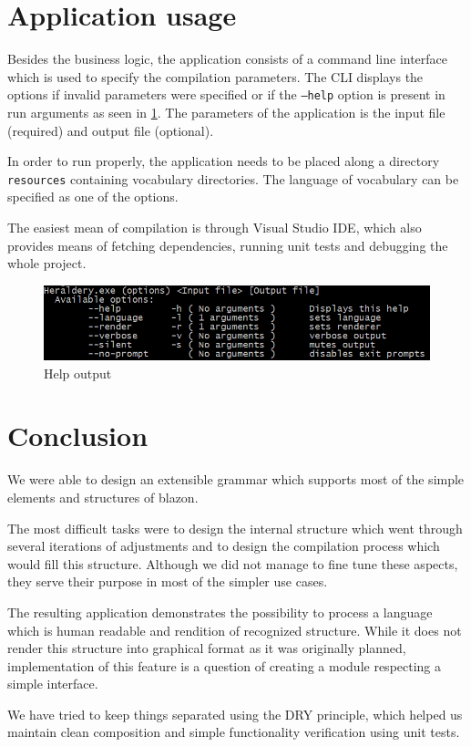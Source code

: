 \documentclass[12pt,a4paper]{article}
\let\oldsection\section
\renewcommand\section{\clearpage\oldsection}
\begin{document}
\section{Application usage}
Besides the business logic, the application consists of a command line interface which is used to specify the compilation parameters.
The CLI displays the options if invalid parameters were specified or if the \texttt{--help} option is present in run arguments as seen in \ref{fig:cli-help}.
The parameters of the application is the input file (required) and output file (optional).

In order to run properly, the application needs to be placed along a directory \texttt{resources} containing vocabulary directories.
The language of vocabulary can be specified as one of the options.

The easiest mean of compilation is through Visual Studio IDE, which also provides means of fetching dependencies, running unit tests and debugging the whole project.

\begin{figure}[h]
	\centering
	\includegraphics[width=1\linewidth]{img/cli-help}
	\caption{Help output}
	\label{fig:cli-help}
\end{figure}


\section{Conclusion}

We were able to design an extensible grammar which supports most of the simple elements and structures of blazon.

The most difficult tasks were to design the internal structure which went through several iterations of adjustments and to design the compilation process which would fill this structure.
Although we did not manage to fine tune these aspects, they serve their purpose in most of the simpler use cases.

The resulting application demonstrates the possibility to process a language which is human readable and rendition of recognized structure.
While it does not render this structure into graphical format as it was originally planned, implementation of this feature is a question of creating a module respecting a simple interface.

We have tried to keep things separated using the DRY principle, which helped us maintain clean composition and simple functionality verification using unit tests.


{\raggedright\small
	
}

\end{document}
